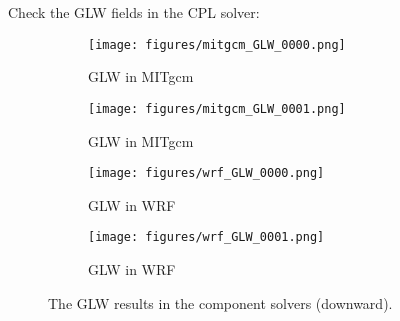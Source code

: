 
Check the GLW fields in the CPL solver:

\begin{figure}[h!]
\centering
  \begin{subfigure}[b]{0.45\linewidth}
  \texttt{[image: figures/mitgcm\_GLW\_0000.png]}
  \caption{GLW in MITgcm}
  \end{subfigure}
  \begin{subfigure}[b]{0.45\linewidth}
  \texttt{[image: figures/mitgcm\_GLW\_0001.png]}
  \caption{GLW in MITgcm}
  \end{subfigure}
  \hspace{0.1in}
  \begin{subfigure}[b]{0.45\linewidth}
  \texttt{[image: figures/wrf\_GLW\_0000.png]}
  \caption{GLW in WRF}
  \end{subfigure}
  \begin{subfigure}[b]{0.45\linewidth}
  \texttt{[image: figures/wrf\_GLW\_0001.png]}
  \caption{GLW in WRF}
  \end{subfigure}
  \caption{The GLW results in the component solvers (downward).}
\label{fig:glw}
\end{figure}
